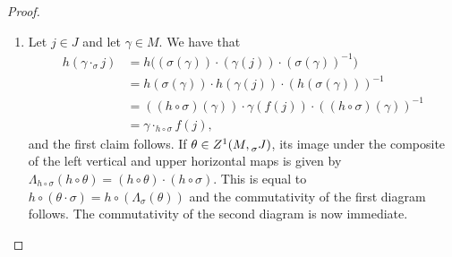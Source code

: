 \documentclass[a4paper,english,12pt]{amsart}
\newcommand{\sJ}{\prescript{}{\sigma}J}
\newtheorem{lem}[equation]{Lemma}
\numberwithin{equation}{subsection}
\begin{document}
\begin{proof}
\begin{enumerate}
\item Let $j\in J$ and let $\gamma\in M$. We have that 
\begin{align*}
h(\gamma\cdot_{\sigma}j)&=h\big((\sigma(\gamma))\cdot(\gamma(j))\cdot(\sigma(\gamma))^{-1}\big)\\
&=h(\sigma(\gamma))\cdot h(\gamma(j))\cdot (h(\sigma(\gamma)))^{-1}\\
&=((h\circ\sigma)(\gamma))\cdot\gamma(f(j))\cdot((h\circ\sigma)(\gamma))^{-1}\\
&=\gamma\cdot_{h\circ\sigma} f(j),
\end{align*}
and the first claim follows. If $\theta\in Z^1(M, \sJ)$, its image under the composite of the left vertical and upper horizontal maps is given by $\Lambda_{h\circ\sigma}(h\circ \theta)=(h\circ\theta)\cdot (h\circ \sigma).$ This is equal to $h\circ (\theta\cdot\sigma)=h\circ(\Lambda_{\sigma}(\theta))$ and the commutativity of the first diagram follows. The commutativity of the second diagram is now immediate.
\end{enumerate}
\end{proof}
\end{document}

